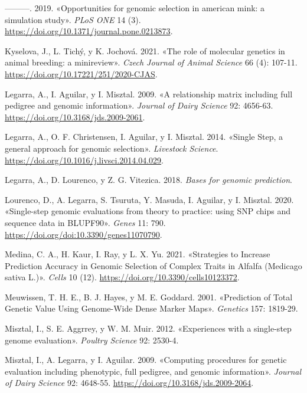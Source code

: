 \documentclass[11pt,spanish,a4paper,oneside,]{book} %
\begin{document}
\leavevmode\hypertarget{ref-cite:75}{}%
---------. 2019. «Opportunities for genomic selection in american mink: a simulation study». \emph{PLoS ONE} 14 (3). \url{https://doi.org/10.1371/journal.pone.0213873}.

\leavevmode\hypertarget{ref-cite:32}{}%
Kyselova, J., L. Tichý, y K. Jochová. 2021. «The role of molecular genetics in animal breeding: a minireview». \emph{Czech Journal of Animal Science} 66 (4): 107-11. \url{https://doi.org/10.17221/251/2020-CJAS}.

\leavevmode\hypertarget{ref-cite:17}{}%
Legarra, A., I. Aguilar, y I. Misztal. 2009. «A relationship matrix including full pedigree and genomic information». \emph{Journal of Dairy Science} 92: 4656-63. \url{https://doi.org/10.3168/jds.2009-2061}.

\leavevmode\hypertarget{ref-cite:15}{}%
Legarra, A., O. F. Christensen, I. Aguilar, y I. Misztal. 2014. «Single Step, a general approach for genomic selection». \emph{Livestock Science}. \url{https://doi.org/10.1016/j.livsci.2014.04.029}.

\leavevmode\hypertarget{ref-cite:30}{}%
Legarra, A., D. Lourenco, y Z. G. Vitezica. 2018. \emph{Bases for genomic prediction}.

\leavevmode\hypertarget{ref-cite:22}{}%
Lourenco, D., A. Legarra, S. Tsuruta, Y. Masuda, I. Aguilar, y I. Misztal. 2020. «Single-step genomic evaluations from theory to practice: using SNP chips and sequence data in BLUPF90». \emph{Genes} 11: 790. \url{https://doi.org/doi:10.3390/genes11070790}.

\leavevmode\hypertarget{ref-cite:38}{}%
Medina, C. A., H. Kaur, I. Ray, y L. X. Yu. 2021. «Strategies to Increase Prediction Accuracy in Genomic Selection of Complex Traits in Alfalfa (Medicago sativa L.)». \emph{Cells} 10 (12). \url{https://doi.org/10.3390/cells10123372}.

\leavevmode\hypertarget{ref-cite:8}{}%
Meuwissen, T. H. E., B. J. Hayes, y M. E. Goddard. 2001. «Prediction of Total Genetic Value Using Genome-Wide Dense Marker Maps». \emph{Genetics} 157: 1819-29.

\leavevmode\hypertarget{ref-cite:14}{}%
Misztal, I., S. E. Aggrrey, y W. M. Muir. 2012. «Experiences with a single-step genome evaluation». \emph{Poultry Science} 92: 2530-4.

\leavevmode\hypertarget{ref-cite:16}{}%
Misztal, I., A. Legarra, y I. Aguilar. 2009. «Computing procedures for genetic evaluation including phenotypic, full pedigree, and genomic information». \emph{Journal of Dairy Science} 92: 4648-55. \url{https://doi.org/10.3168/jds.2009-2064}.
\end{document}
